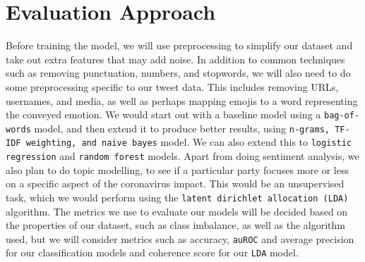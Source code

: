 \section*{Evaluation Approach}\label{sec:approach}

Before training the model, we will use preprocessing to simplify our dataset and take out extra
features that may add noise. In addition to common techniques such as removing punctuation,
numbers, and stopwords, we will also need to do some preprocessing specific to our tweet data.
This includes removing URLs, usernames, and media, as well as perhaps mapping emojis to a
word representing the conveyed emotion. We would start out with a baseline model using a
\texttt{bag-of-words} model, and then extend it to produce better results, using \texttt{n-grams, TF-IDF
weighting, and naive bayes} model. We can also extend this to \texttt{logistic regression} and \texttt{random
forest} models. Apart from doing sentiment analysis, we also plan to do topic modelling, to see if
a particular party focuses more or less on a specific aspect of the coronavirus impact. This would
be an unsupervised task, which we would perform using the \texttt{latent dirichlet allocation (LDA)}
algorithm. The metrics we use to evaluate our models will be decided based on the properties of
our dataset, such as class imbalance, as well as the algorithm used, but we will consider metrics
such as accuracy, \texttt{auROC} and average precision for our classification models and coherence
score for our \texttt{LDA} model.